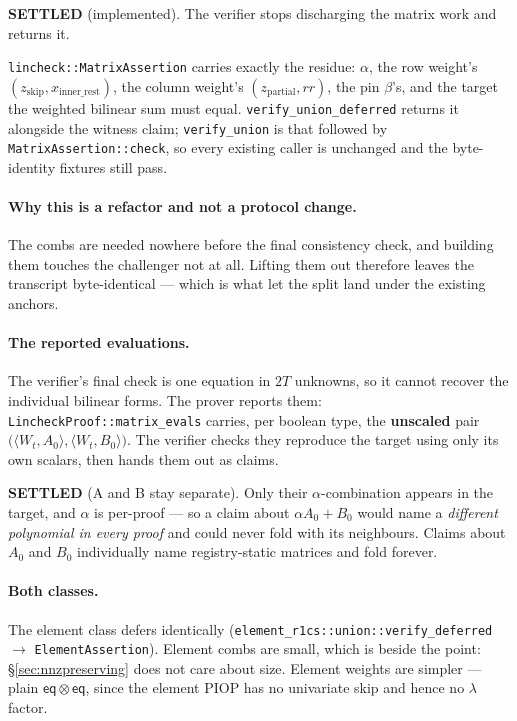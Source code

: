 \documentclass[11pt]{article}
\newcommand{\eq}{\mathsf{eq}}
\newcommand{\ip}[2]{\langle #1, #2 \rangle}
\newcommand{\code}[1]{\texttt{#1}}
\newcommand{\settled}[1]{\medskip\noindent\textbf{SETTLED} (#1).\xspace}
\theoremstyle{definition}
\begin{document}
\settled{implemented} The verifier stops discharging the matrix work and
returns it.

\code{lincheck::MatrixAssertion} carries exactly the residue: $\alpha$, the
row weight's $(z_{\text{skip}}, x_{\text{inner\_rest}})$, the column
weight's $(z_{\text{partial}}, rr)$, the pin $\beta$'s, and the target the
weighted bilinear sum must equal. \code{verify\_union\_deferred} returns it
alongside the witness claim; \code{verify\_union} is that followed by
\code{MatrixAssertion::check}, so every existing caller is unchanged and the
byte-identity fixtures still pass.

\paragraph{Why this is a refactor and not a protocol change.} The combs are
needed nowhere before the final consistency check, and building them touches
the challenger not at all. Lifting them out therefore leaves the transcript
byte-identical --- which is what let the split land under the existing
anchors.

\paragraph{The reported evaluations.} The verifier's final check is one
equation in $2T$ unknowns, so it cannot recover the individual bilinear
forms. The prover reports them: \code{LincheckProof::matrix\_evals} carries,
per boolean type, the \textbf{unscaled} pair
$\bigl(\ip{W_t}{A_0}, \ip{W_t}{B_0}\bigr)$. The verifier checks they
reproduce the target using only its own scalars, then hands them out as
claims.

\settled{A and B stay separate} Only their $\alpha$-combination appears in
the target, and $\alpha$ is per-proof --- so a claim about
$\alpha A_0 + B_0$ would name a \emph{different polynomial in every proof}
and could never fold with its neighbours. Claims about $A_0$ and $B_0$
individually name registry-static matrices and fold forever.

\paragraph{Both classes.} The element class defers identically
(\code{element\_r1cs::union::verify\_deferred} $\to$
\code{ElementAssertion}). Element combs are small, which is beside the
point: \S\ref{sec:nnzpreserving} does not care about size. Element weights
are simpler --- plain $\eq \otimes \eq$, since the element PIOP has no
univariate skip and hence no $\lambda$ factor.
\end{document}
